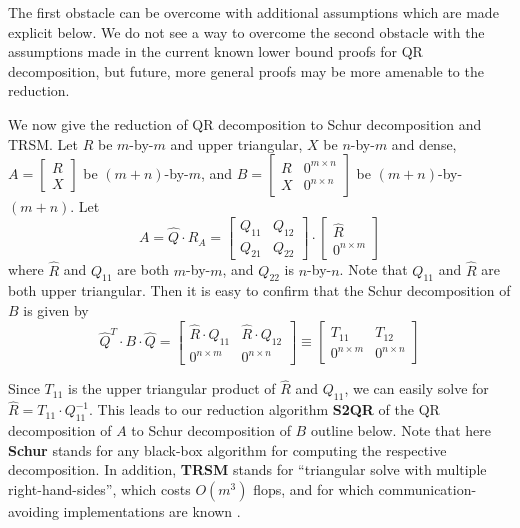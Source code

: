 \documentclass{article}
\newcommand{\bmat}{\left[ \begin{array}}
\newcommand{\emat}{\end{array} \right]}
\newcommand{\ignore}[1]{}
\theoremstyle{definition}
\begin{document}
The first obstacle can be overcome with additional assumptions which 
are made explicit below.  We do not see a way to overcome the 
second obstacle with the assumptions made in the current known 
lower bound proofs for QR decomposition, but future, more general 
proofs may be more amenable to the reduction.

\ignore{
Here we give a simple reduction that shows that the cost of computing the Schur form of a matrix is bounded below by the cost of computing the QR decomposition, under certain assumptions made clear below.
}


We now give the reduction of QR decomposition to Schur decomposition and TRSM.  Let $R$ be $m$-by-$m$ and upper triangular, $X$ be $n$-by-$m$ and dense, $A = \bmat{c} R \\ X \emat$ be $(m+n)$-by-$m$, and $B = \bmat{cc} R & 0^{m \times n} \\ X & 0^{n \times n} \emat$ be $(m+n)$-by-$(m+n)$. Let 
\[
A = \hat{Q} \cdot R_A = \bmat{cc} Q_{11} & Q_{12} \\ Q_{21} & Q_{22} \emat \cdot
\bmat{c} \hat{R} \\ 0^{n \times m} \emat
\]
where $\hat{R}$ and $Q_{11}$ are both $m$-by-$m$, and $Q_{22}$ is $n$-by-$n$. Note that $Q_{11}$ and $\hat{R}$ are both upper triangular. Then it is easy to confirm that the Schur decomposition of $B$ is given by
\[
 \hat{Q}^T \cdot B \cdot \hat{Q} = 
     \bmat{cc} \hat{R} \cdot Q_{11} & \hat{R} \cdot Q_{12}
   \\ 0^{n \times m} & 0^{n \times n} \emat \equiv
\bmat{cc} T_{11} & T_{12} \\ 0^{n \times m} & 0^{n \times n} \emat
\]

Since $T_{11}$ is the upper triangular product of $\hat{R}$ and $Q_{11}$, 
we can easily solve for $\hat{R} = T_{11} \cdot Q_{11}^{-1}$. 
This leads to our reduction algorithm \textbf{S2QR} of the QR decomposition of $A$ to 
Schur decomposition of $B$ outline below. Note that here \textbf{Schur} 
stands for any black-box algorithm for computing the respective decomposition. 
In addition, \textbf{TRSM} stands for ``triangular solve with multiple right-hand-sides'', 
which costs $O(m^3)$ flops, and for which communication-avoiding implementations are known \cite{BDHS10}.
\end{document}
